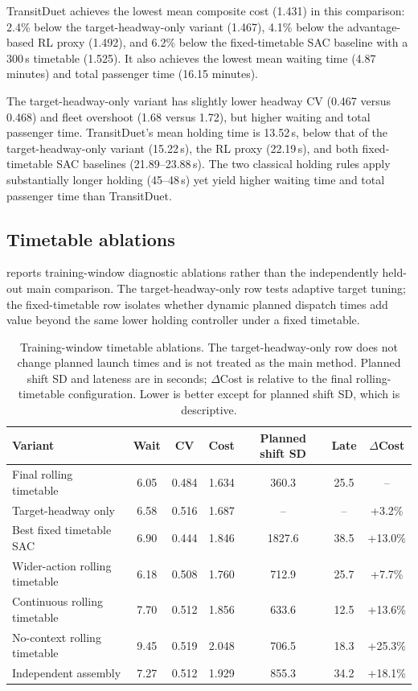 TransitDuet achieves the lowest mean composite cost (1.431) in this comparison: 2.4\% below the target-headway-only variant (1.467), 4.1\% below the advantage-based RL proxy (1.492), and 6.2\% below the fixed-timetable SAC baseline with a 300\,s timetable (1.525). It also achieves the lowest mean waiting time (4.87 minutes) and total passenger time (16.15 minutes).

The target-headway-only variant has slightly lower headway CV (0.467 versus 0.468) and fleet overshoot (1.68 versus 1.72), but higher waiting and total passenger time. TransitDuet's mean holding time is 13.52\,s, below that of the target-headway-only variant (15.22\,s), the RL proxy (22.19\,s), and both fixed-timetable SAC baselines (21.89--23.88\,s). The two classical holding rules apply substantially longer holding (45--48\,s) yet yield higher waiting time and total passenger time than TransitDuet.

\subsection{Timetable ablations}
\label{sec:ablation}

 reports training-window diagnostic ablations rather than the independently held-out main comparison. The target-headway-only row tests adaptive target tuning; the fixed-timetable row isolates whether dynamic planned dispatch times add value beyond the same lower holding controller under a fixed timetable.

\begin{table}[H]
\centering
\caption{Training-window timetable ablations. The target-headway-only row does not change planned launch times and is not treated as the main method. Planned shift SD and lateness are in seconds; $\Delta$Cost is relative to the final rolling-timetable configuration. Lower is better except for planned shift SD, which is descriptive.}
\label{tab:ablations}
\scriptsize
\setlength{\tabcolsep}{2.4pt}
\begin{tabular}{@{}lcccccc@{}}
\toprule
Variant & Wait & CV & Cost & Planned shift SD & Late & $\Delta$Cost \\
\midrule
Final rolling timetable & 6.05 & 0.484 & 1.634 & 360.3 & 25.5 & -- \\
Target-headway only & 6.58 & 0.516 & 1.687 & -- & -- & +3.2\% \\
Best fixed timetable SAC & 6.90 & 0.444 & 1.846 & 1827.6 & 38.5 & +13.0\% \\
Wider-action rolling timetable & 6.18 & 0.508 & 1.760 & 712.9 & 25.7 & +7.7\% \\
Continuous rolling timetable & 7.70 & 0.512 & 1.856 & 633.6 & 12.5 & +13.6\% \\
No-context rolling timetable & 9.45 & 0.519 & 2.048 & 706.5 & 18.3 & +25.3\% \\
Independent assembly & 7.27 & 0.512 & 1.929 & 855.3 & 34.2 & +18.1\% \\
\bottomrule
\end{tabular}
\end{table}

